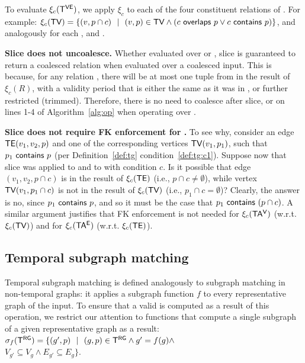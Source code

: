 To evaluate $\xi_c (\mathsf{T^{VE}})$, we apply $\xi_c$ to each of the four
constituent relations of \tve.  For example: 
$\xi_c (\textsf{TV}) = \{ (v, p
\cap c)~~|~~(v, p) \in \textsf{TV} \wedge (c~\mathsf{overlaps}~p \vee c~\mathsf{contains}~p) \}$, 
and analogously for each \te, \tav and \tae.



{\bf Slice does not uncoalesce.} Whether evaluated over \trg or \tve,
slice is guaranteed to return a coalesced relation when evaluated over
a coalesced input.  This is because, for any relation , there
will be at most one tuple from  in the result of $\xi_c (R)$,
with a validity period that is either the same as it was in ,
or further restricted (trimmed).  Therefore, there is no need to
coalesce \trg after slice, or on lines 1-4 of Algorithm~\ref{alg:op}
when operating over \tve.

{\bf Slice does not require FK enforcement for \tve.}  To see why,
consider an edge $\textsf{TE}(v_1, v_2, p)$ and one of the corresponding
vertices $\textsf{TV}(v_1, p_1)$, such that $p_1~\mathsf{contains}~p$ (per
Definition~\ref{def:tg} condition~\ref{def:tg:c1}).  Suppose now that
slice was applied to \tv and to \te with condition $c$.  Is it
possible that edge $(v_1, v_2, p \cap c)$ is in the result of $\xi_c
(\textsf{TE})$ (i.e., $p \cap c \neq \emptyset$), while vertex $\textsf{TV}(v_1, p_1 \cap
c)$ is not in the result of $\xi_c (\textsf{TV})$ (i.e., $p_1 \cap c =
\emptyset$)?  Clearly, the answer is no, since
$p_1~\mathsf{contains}~p$, and so it must be the case that
$p_1~\mathsf{contains}~(p \cap c)$.  A similar argument justifies that
FK enforcement is not needed for $\xi_c(\mathsf{TA^{V}})$ (w.r.t. $\xi_c (\textsf{TV})$) and
for $\xi_c(\mathsf{TA^{E}})$ (w.r.t. $\xi_c (\textsf{TE})$).

\subsection{Temporal subgraph matching}
\label{sec:algebra:subgraph}

Temporal subgraph matching is defined analogously to subgraph matching
in non-temporal graphs: it applies a subgraph function $f$ to every
representative graph of the input.  To ensure that a valid \tg is
computed as a result of this operation, we restrict our attention to
functions that compute a single subgraph of a given representative
graph as a result: $\sigma_f (\mathsf{T^{RG}}) = \{ (g', p)~~|~~(g, p) \in \mathsf{T^{RG}}
\wedge g' = f(g) \wedge$\\$V_{g'} \subseteq V_{g} \wedge E_{g'}
\subseteq E_{g} \}$.


